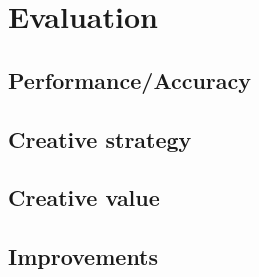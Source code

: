 
\chapter{Evaluation} %

\label{Chapter6} %


\section{Performance/Accuracy}


\section{Creative strategy}


\section{Creative value}


\section{Improvements}

